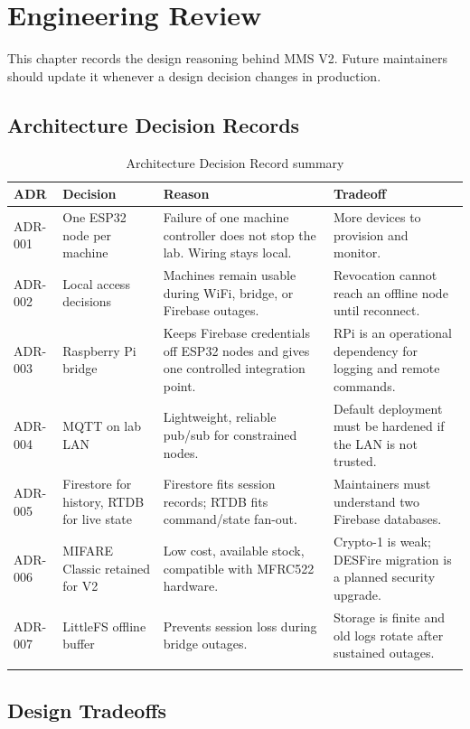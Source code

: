 \chapter{Engineering Review}
\label{ch:engineering_review}

This chapter records the design reasoning behind MMS V2. Future maintainers should update it whenever a design decision changes in production.

\section{Architecture Decision Records}

\begin{longtable}{L{2cm}L{4cm}L{4.5cm}L{4.5cm}}
\toprule
\textbf{ADR} & \textbf{Decision} & \textbf{Reason} & \textbf{Tradeoff} \\
\midrule
\endhead
ADR-001 & One ESP32 node per machine & Failure of one machine controller does not stop the lab. Wiring stays local. & More devices to provision and monitor. \\
ADR-002 & Local access decisions & Machines remain usable during WiFi, bridge, or Firebase outages. & Revocation cannot reach an offline node until reconnect. \\
ADR-003 & Raspberry Pi bridge & Keeps Firebase credentials off ESP32 nodes and gives one controlled integration point. & RPi is an operational dependency for logging and remote commands. \\
ADR-004 & MQTT on lab LAN & Lightweight, reliable pub/sub for constrained nodes. & Default deployment must be hardened if the LAN is not trusted. \\
ADR-005 & Firestore for history, RTDB for live state & Firestore fits session records; RTDB fits command/state fan-out. & Maintainers must understand two Firebase databases. \\
ADR-006 & MIFARE Classic retained for V2 & Low cost, available stock, compatible with MFRC522 hardware. & Crypto-1 is weak; DESFire migration is a planned security upgrade. \\
ADR-007 & LittleFS offline buffer & Prevents session loss during bridge outages. & Storage is finite and old logs rotate after sustained outages. \\
\bottomrule
\caption{Architecture Decision Record summary}
\label{tab:adr_summary}
\end{longtable}

\section{Design Tradeoffs}


